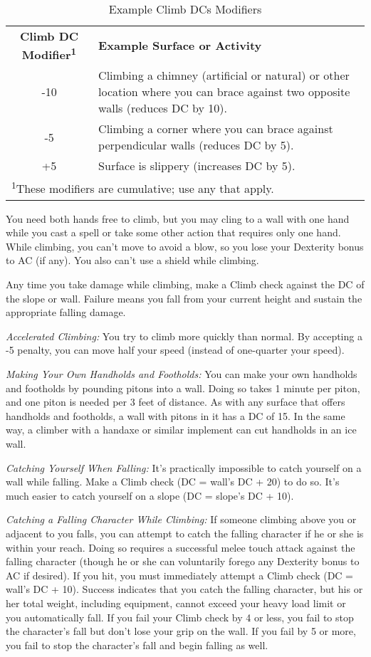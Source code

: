 \begin{table}[htb]
\caption{Example Climb DCs Modifiers}
\centering
\begin{tabular}{c p{12.5cm}}
\textbf{Climb DC Modifier\textsuperscript{1}} & \textbf{Example Surface or Activity}\\
-10 & Climbing a chimney (artificial or natural) or other location where you can brace against two opposite walls (reduces DC by 10).\\
-5 & Climbing a corner where you can brace against perpendicular walls (reduces DC by 5).\\
+5 & Surface is slippery (increases DC by 5).\\
\multicolumn{2}{l}{\textsuperscript{1}These modifiers are cumulative; use any that apply.}
\end{tabular}
\end{table}

You need both hands free to climb, but you may cling to a wall with one hand while 
you cast a spell or take some other action that requires only one hand. While climbing, 
you can't move to avoid a blow, so you lose your Dexterity bonus to AC (if any). 
You also can't use a shield while climbing.

Any time you take damage while climbing, make a Climb check against the DC of the 
slope or wall. Failure means you fall from your current height and sustain the 
appropriate falling damage.

\textit{Accelerated Climbing:} You try to climb more quickly than normal. By accepting 
a -5 penalty, you can move half your speed (instead of one-quarter your speed).

\textit{Making Your Own Handholds and Footholds:} You can make your own handholds 
and footholds by pounding pitons into a wall. Doing so takes 1 minute per piton, 
and one piton is needed per 3 feet of distance. As with any surface that offers 
handholds and footholds, a wall with pitons in it has a DC of 15. In the same way, 
a climber with a handaxe or similar implement can cut handholds in an ice wall.

\textit{Catching Yourself When Falling:} It's practically impossible to catch yourself 
on a wall while falling. Make a Climb check (DC = wall's DC + 20) to do so. It's 
much easier to catch yourself on a slope (DC = slope's DC + 10).

\textit{Catching a Falling Character While Climbing:} If someone climbing above 
you or adjacent to you falls, you can attempt to catch the falling character if 
he or she is within your reach. Doing so requires a successful melee touch attack 
against the falling character (though he or she can voluntarily forego any Dexterity 
bonus to AC if desired). If you hit, you must immediately attempt a Climb check 
(DC = wall's DC + 10). Success indicates that you catch the falling character, 
but his or her total weight, including equipment, cannot exceed your heavy load 
limit or you automatically fall. If you fail your Climb check by 4 or less, you 
fail to stop the character's fall but don't lose your grip on the wall. If you 
fail by 5 or more, you fail to stop the character's fall and begin falling as well.

